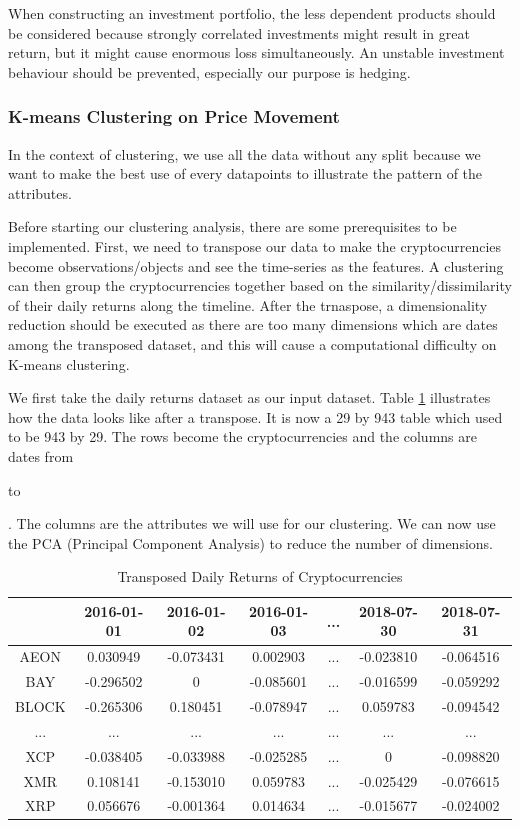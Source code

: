 \documentclass[11pt]{article} %
\theoremstyle{plain}
\theoremstyle{definition}
\begin{document}
When constructing an investment portfolio, the less dependent products should be considered because strongly correlated investments might result in great return, but it might cause enormous loss simultaneously. An unstable investment behaviour should be prevented, especially our purpose is hedging.

\subsubsection{K-means Clustering on Price Movement}

In the context of clustering, we use all the data without any split because we want to make the best use of every datapoints to illustrate the pattern of the attributes.

Before starting our clustering analysis, there are some prerequisites to be implemented. First, we need to transpose our data to make the cryptocurrencies become observations/objects and see the time-series as the features. A clustering can then group the cryptocurrencies together based on the similarity/dissimilarity of their daily returns along the timeline. After the trnaspose, a dimensionality reduction should be executed as there are too many dimensions which are dates among the transposed dataset, and this will cause a computational difficulty on K-means clustering.

We first take the daily returns dataset as our input dataset. Table \ref{table:tpcrypto} illustrates how the data looks like after a transpose. It is now a 29 by 943 table which used to be 943 by 29. The rows become the cryptocurrencies and the columns are dates from \date{2016-01-01} to \date{2018-07-31}. The columns are the attributes we will use for our clustering. We can now use the PCA (Principal Component Analysis) to reduce the number of dimensions.

{
  \begin{table}[ht]
    \centering
    \scriptsize
    \begin{tabular}{|c|c c c c c c|}
      \hline
       & 2016-01-01 & 2016-01-02 & 2016-01-03 & ... & 2018-07-30 & 2018-07-31 \\ [0.5ex]
      \hline
      AEON & 0.030949 & -0.073431 & 0.002903 & ... & -0.023810 & -0.064516 \\
      \hline
      BAY & -0.296502 & 0 & -0.085601 & ... & -0.016599 & -0.059292 \\
      \hline
      BLOCK & -0.265306 & 0.180451 & -0.078947 & ... & 0.059783 & -0.094542 \\
      \hline
      ... & ... & ... & ... & ... & ... & ... \\
      \hline
      XCP & -0.038405 & -0.033988 & -0.025285 & ... & 0 & -0.098820 \\
      \hline
      XMR & 0.108141 & -0.153010 & 0.059783 & ... & -0.025429 & -0.076615 \\
      \hline
      XRP & 0.056676 & 	-0.001364 & 0.014634 & ... & -0.015677 & -0.024002 \\
      \hline
    \end{tabular}
    \caption{Transposed Daily Returns of Cryptocurrencies}
    \label{table:tpcrypto}
  \end{table}
}
\end{document}
